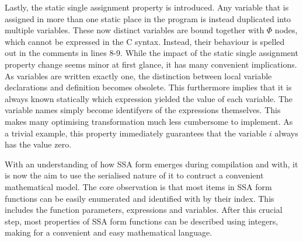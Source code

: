     Lastly, the static single assignment property is introduced.
    Any variable that is assigned in more than one static place in the program
    is instead duplicated into multiple variables.
    These now distinct variables are bound together with $\Phi$ nodes, which
    cannot be expressed in the C syntax.
    Instead, their behaviour is spelled out in the comments in lines 8-9.
    While the impact of the static single assignment property change seems minor
    at first glance, it has many convenient implications.
    As variables are written exactly one, the distinction between local variable
    declarations and definition becomes obsolete.
    This furthermore implies that it is always known statically which expression
    yielded the value of each variable.
    The variable names simply become identifyers of the expressions themselves.
    This makes many optimising transformation much less cumbersome to
    implement.
    As a trivial example, this property immediately guarantees that the variable
    $i$ always has the value zero.

    With an understanding of how SSA form emerges during compilation and with,
    it is now the aim to use the serialised nature of it to contruct a
    convenient mathematical model.
    The core observation is that most items in SSA form functions can be easily
    enumerated and identified with by their index.
    This includes the function parameters, expressions and variables.
    After this crucial step, most properties of SSA form functions can be
    described using integers, making for a convenient and easy mathematical
    language.
    
    
    
    

